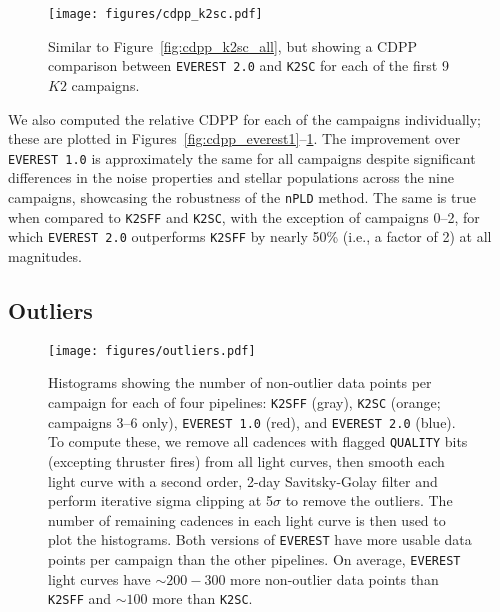 \documentclass[]{emulateapj}
\begin{document}
\begin{figure}[hbt]
  \begin{center}
      \texttt{[image: figures/cdpp\_k2sc.pdf]}
       \caption{Similar to Figure~\ref{fig:cdpp_k2sc_all}, but showing a CDPP comparison between
       \texttt{EVEREST 2.0} and \texttt{K2SC} for each of the first 9 $K2$ campaigns.}
     \label{fig:cdpp_k2sc}
  \end{center}
\end{figure}

We also computed the relative CDPP for each of the campaigns individually; these are
plotted in Figures~\ref{fig:cdpp_everest1}--\ref{fig:cdpp_k2sc}. The improvement
over \texttt{EVEREST 1.0} is approximately the same for all campaigns despite significant
differences in the noise properties and stellar populations across the nine campaigns,
showcasing the robustness of the \texttt{nPLD} method.
The same is true when compared to \texttt{K2SFF} and \texttt{K2SC}, with the exception of
campaigns 0--2, for which \texttt{EVEREST 2.0} outperforms \texttt{K2SFF} by nearly 50\%
(i.e., a factor of 2) at all magnitudes.

\subsection{Outliers}

\begin{figure}[hbt]
  \begin{center}
      \texttt{[image: figures/outliers.pdf]}
       \caption{Histograms showing the number of non-outlier data points per campaign for each
        of four pipelines: \texttt{K2SFF} (gray), \texttt{K2SC} (orange; campaigns 3--6 only),
        \texttt{EVEREST 1.0} (red), and \texttt{EVEREST 2.0} (blue). To compute these, we remove all cadences
        with flagged \texttt{QUALITY} bits (excepting thruster fires) from all light curves, then
        smooth each light curve with a second order, 2-day Savitsky-Golay filter and perform iterative
        sigma clipping at 5$\sigma$ to remove the outliers. The number of remaining cadences in
        each light curve is then used to plot the histograms. Both versions of \texttt{EVEREST}
        have more usable data points per campaign than the other pipelines. On average,
        \texttt{EVEREST} light curves have ${\sim}200-300$ more non-outlier data points than \texttt{K2SFF}
        and ${\sim}100$ more than \texttt{K2SC}.}
     \label{fig:outliers}
  \end{center}
\end{figure}
\end{document}
